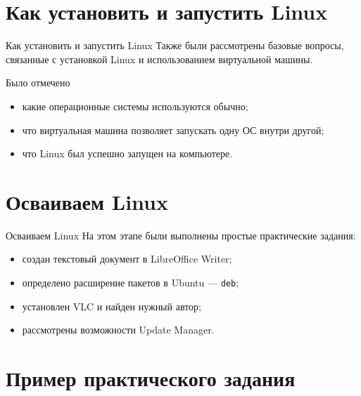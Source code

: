 \documentclass[
  11pt,
  ignorenonframetext,
  aspectratio=169,
  russian,
]{beamer}
\providecommand{\tightlist}{%
  \setlength{\itemsep}{0pt}\setlength{\parskip}{0pt}}
\begin{document}
\section{Как установить и запустить
Linux}\label{ux43aux430ux43a-ux443ux441ux442ux430ux43dux43eux432ux438ux442ux44c-ux438-ux437ux430ux43fux443ux441ux442ux438ux442ux44c-linux}

\begin{frame}{Как установить и запустить Linux}
Также были рассмотрены базовые вопросы, связанные с установкой Linux и
использованием виртуальной машины.
\end{frame}

\begin{frame}{Было отмечено}
\protect{}\label{ux431ux44bux43bux43e-ux43eux442ux43cux435ux447ux435ux43dux43e}
\begin{itemize}[<+->]
\tightlist
\item
  какие операционные системы используются обычно;
\item
  что виртуальная машина позволяет запускать одну ОС внутри другой;
\item
  что Linux был успешно запущен на компьютере.
\end{itemize}
\end{frame}

\section{Осваиваем
Linux}\label{ux43eux441ux432ux430ux438ux432ux430ux435ux43c-linux}

\begin{frame}[fragile]{Осваиваем Linux}
На этом этапе были выполнены простые практические задания:

\begin{itemize}[<+->]
\tightlist
\item
  создан текстовый документ в LibreOffice Writer;
\item
  определено расширение пакетов в Ubuntu --- \texttt{deb};
\item
  установлен VLC и найден нужный автор;
\item
  рассмотрены возможности Update Manager.
\end{itemize}
\end{frame}

\section{Пример практического
задания}\label{ux43fux440ux438ux43cux435ux440-ux43fux440ux430ux43aux442ux438ux447ux435ux441ux43aux43eux433ux43e-ux437ux430ux434ux430ux43dux438ux44f}
\end{document}
